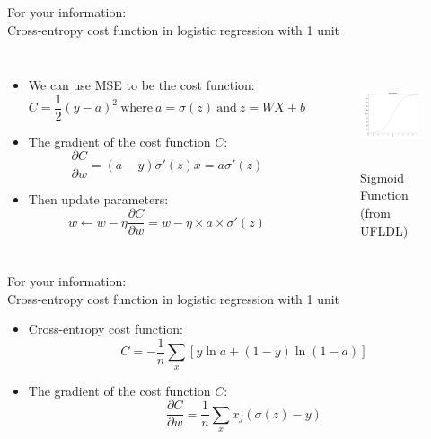 \documentclass[10pt]{beamer}
\begin{document}
	\begin{frame}{For your information: \\ Cross-entropy cost function in logistic regression with 1 unit}
		\begin{columns}
			\begin{itemize}
				\item We can use MSE to be the cost function:
				$$C=\frac{1}{2}(y-a)^2 ~\text{where}~ a=\sigma(z) ~\text{and}~ z=WX+b$$
				\onslide<2->
				\item The gradient of the cost function $C$:
				$$\frac{\partial C}{\partial w}=(a-y)\sigma'(z)x=a\sigma'(z)$$
				\onslide<3->
				\item Then update parameters:
				$$w\leftarrow w-\eta\frac{\partial C}{\partial w}=w-\eta\times a\times \sigma'(z)$$
			\end{itemize}
			\begin{figure}
				\includegraphics[height=8em]{figures/sigmoid.png}
				\caption{Sigmoid Function (from \href{http://ufldl.stanford.edu/wiki/index.php/File:Sigmoid_Function.png}{UFLDL})}
			\end{figure}
		\end{columns}
	\end{frame}

	\begin{frame}{For your information: \\ Cross-entropy cost function in logistic regression with 1 unit}
		\begin{itemize}
			\item Cross-entropy cost function:
			$$C=-\frac{1}{n}\sum_x\left[y\ln a+(1-y)\ln (1-a)\right]$$
			\pause
			\item The gradient of the cost function $C$:
			$$\frac{\partial C}{\partial w}=\frac{1}{n}\sum_xx_j(\sigma(z)-y)$$
		\end{itemize}
	\end{frame}
\end{document}
